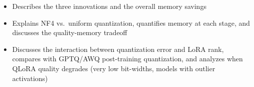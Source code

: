 \begin{interviewq}
\goodgreat
\begin{itemize}
    \item {} Describes the three innovations and the overall memory savings
    \item {} Explains NF4 vs.\ uniform quantization, quantifies memory at
          each stage, and discusses the quality-memory tradeoff
    \item {} Discusses the interaction between quantization error and LoRA
          rank, compares with GPTQ/AWQ post-training quantization, and analyzes when
          QLoRA quality degrades (very low bit-widths, models with outlier activations)
\end{itemize}

\end{interviewq}

\bigskip

